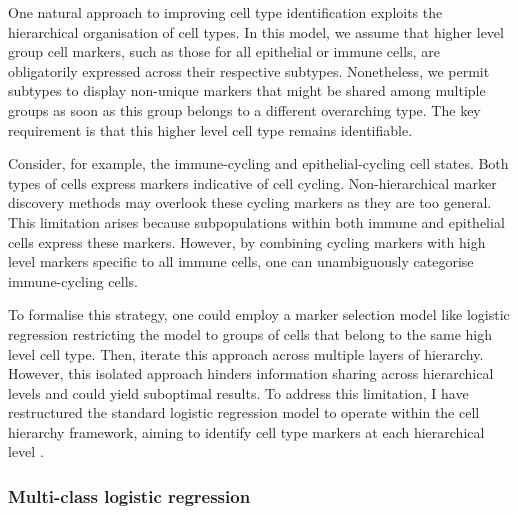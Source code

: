 One natural approach to improving cell type identification exploits the hierarchical organisation of cell types. In this model, we assume that higher level group cell markers, such as those for all epithelial or immune cells, are obligatorily expressed across their respective subtypes. Nonetheless, we permit subtypes to display non-unique markers that might be shared among multiple groups as soon as this group belongs to a different overarching type. The key requirement is that this higher level cell type remains identifiable.

Consider, for example, the immune-cycling and epithelial-cycling cell states. Both types of cells express markers indicative of cell cycling. Non-hierarchical marker discovery methods may overlook these cycling markers as they are too general. This limitation arises because subpopulations within both immune and epithelial cells express these markers. However, by combining cycling markers with high level markers specific to all immune cells, one can unambiguously categorise immune-cycling cells.

To formalise this strategy, one could employ a marker selection model like logistic regression restricting the model to groups of cells that belong to the same high level cell type. Then, iterate this approach across multiple layers of hierarchy. However, this isolated approach hinders information sharing across hierarchical levels and could yield suboptimal results. To address this limitation, I have restructured the standard logistic regression model to operate within the cell hierarchy framework, aiming to identify cell type markers at each hierarchical level .


\subsubsection*{Multi-class logistic regression}

